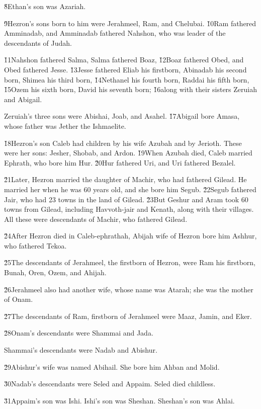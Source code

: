 \v{8}Ethan's son was Azariah.

\v{9}Hezron's sons born to him were Jerahmeel, Ram, and Chelubai. \v{10}Ram fathered Amminadab, and Amminadab fathered Nahshon, who was leader of the descendants of Judah.

\v{11}Nahshon fathered Salma, Salma fathered Boaz, \v{12}Boaz fathered Obed, and Obed fathered Jesse. \v{13}Jesse fathered Eliab his firstborn, Abinadab his second born, Shimea his third born, \v{14}Nethanel his fourth born, Raddai his fifth born, \v{15}Ozem his sixth born, David his seventh born; \v{16}along with their sisters Zeruiah and Abigail.

Zeruiah's three sons were Abishai, Joab, and Asahel. \v{17}Abigail bore Amasa, whose father was Jether the Ishmaelite.

\v{18}Hezron's son Caleb had children by his wife Azubah and by Jerioth. These were her sons: Jesher, Shobab, and Ardon. \v{19}When Azubah died, Caleb married Ephrath, who bore him Hur. \v{20}Hur fathered Uri, and Uri fathered Bezalel.

\v{21}Later, Hezron married the daughter of Machir, who had fathered Gilead. He married her when he was 60 years old, and she bore him Segub. \v{22}Segub fathered Jair, who had 23 towns in the land of Gilead. \v{23}But Geshur and Aram took 60 towns from Gilead, including Havvoth-jair and Kenath, along with their villages. All these were descendants of Machir, who fathered Gilead.

\v{24}After Hezron died in Caleb-ephrathah, Abijah wife of Hezron bore him Ashhur, who fathered Tekoa.

\v{25}The descendants of Jerahmeel, the firstborn of Hezron, were Ram his firstborn, Bunah, Oren, Ozem, and Ahijah.

\v{26}Jerahmeel also had another wife, whose name was Atarah; she was the mother of Onam.

\v{27}The descendants of Ram, firstborn of Jerahmeel were Maaz, Jamin, and Eker.

\v{28}Onam's descendants were Shammai and Jada.

Shammai's descendants were Nadab and Abishur.

\v{29}Abishur's wife was named Abihail. She bore him Ahban and Molid.

\v{30}Nadab's descendants were Seled and Appaim. Seled died childless.

\v{31}Appaim's son was Ishi. Ishi's son was Sheshan. Sheshan's son was Ahlai.

